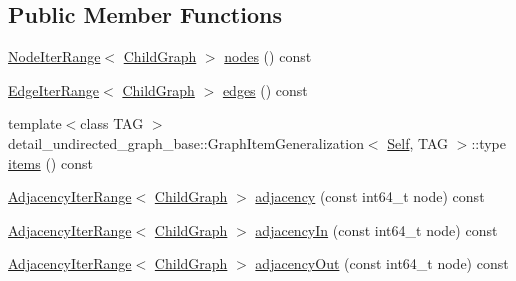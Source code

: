 \subsection*{Public Member Functions}
\begin{DoxyCompactItemize}
\item 
\hyperlink{structnifty_1_1graph_1_1UndirectedGraphBase_1_1NodeIterRange}{Node\+Iter\+Range}$<$ \hyperlink{classnifty_1_1graph_1_1UndirectedGraphBase_af2541cf9fb91440ff0a7b56dd5a6be29}{Child\+Graph} $>$ \hyperlink{classnifty_1_1graph_1_1UndirectedGraphBase_ad554bdf7772878fb846b4f3a753f338f}{nodes} () const
\item 
\hyperlink{structnifty_1_1graph_1_1UndirectedGraphBase_1_1EdgeIterRange}{Edge\+Iter\+Range}$<$ \hyperlink{classnifty_1_1graph_1_1UndirectedGraphBase_af2541cf9fb91440ff0a7b56dd5a6be29}{Child\+Graph} $>$ \hyperlink{classnifty_1_1graph_1_1UndirectedGraphBase_ace8277ea99ae46b11bf9070955abf846}{edges} () const
\item 
{\footnotesize template$<$class T\+AG $>$ }\\detail\+\_\+undirected\+\_\+graph\+\_\+base\+::\+Graph\+Item\+Generalization$<$ \hyperlink{classnifty_1_1graph_1_1UndirectedGraphBase_a3a637f240a8d05794be99e5f290a71b9}{Self}, T\+AG $>$\+::type \hyperlink{classnifty_1_1graph_1_1UndirectedGraphBase_ac1e7c6a7e6e20cb8b184e331789965cd}{items} () const
\item 
\hyperlink{structnifty_1_1graph_1_1UndirectedGraphBase_1_1AdjacencyIterRange}{Adjacency\+Iter\+Range}$<$ \hyperlink{classnifty_1_1graph_1_1UndirectedGraphBase_af2541cf9fb91440ff0a7b56dd5a6be29}{Child\+Graph} $>$ \hyperlink{classnifty_1_1graph_1_1UndirectedGraphBase_a46eb06d4cd54189ba6b992735494b788}{adjacency} (const int64\+\_\+t node) const
\item 
\hyperlink{structnifty_1_1graph_1_1UndirectedGraphBase_1_1AdjacencyIterRange}{Adjacency\+Iter\+Range}$<$ \hyperlink{classnifty_1_1graph_1_1UndirectedGraphBase_af2541cf9fb91440ff0a7b56dd5a6be29}{Child\+Graph} $>$ \hyperlink{classnifty_1_1graph_1_1UndirectedGraphBase_a40d901c4ac73481fe54e829749b4b079}{adjacency\+In} (const int64\+\_\+t node) const
\item 
\hyperlink{structnifty_1_1graph_1_1UndirectedGraphBase_1_1AdjacencyIterRange}{Adjacency\+Iter\+Range}$<$ \hyperlink{classnifty_1_1graph_1_1UndirectedGraphBase_af2541cf9fb91440ff0a7b56dd5a6be29}{Child\+Graph} $>$ \hyperlink{classnifty_1_1graph_1_1UndirectedGraphBase_ab9ce419a67ba4351bb2066a9b85a2b32}{adjacency\+Out} (const int64\+\_\+t node) const
\item 

\end{DoxyCompactItemize}
